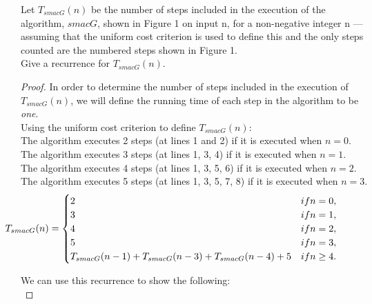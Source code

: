 \documentclass[12pt]{article}
\newenvironment{problem}[2][Problem]{\begin{trivlist}
\item[\hskip \labelsep {\bfseries #1}\hskip \labelsep {\bfseries #2.}]}{\end{trivlist}}
\begin{document}

\begin{problem}{4}
Let $T_{smacG}(n)$ be the number of steps included in the execution of the algorithm, $smacG$,
shown in Figure 1 on input n, for a non-negative integer n — assuming that the uniform
cost criterion is used to define this and the only steps counted are the numbered steps
shown in Figure 1.
\\
Give a recurrence for $T_{smacG}(n)$.
\end{problem}

\begin{proof}
    In order to determine the number of steps included in the execution of $T_{smacG}(n)$, we will define the running time of each step in the algorithm to be \textit{one}.\\

    \noindent Using the uniform cost criterion to define $T_{smacG}(n)$: \\
    
    \noindent The algorithm executes 2 steps (at lines 1 and 2) if it is executed when $n = 0$. \\
    \noindent The algorithm executes 3 steps (at lines 1, 3, 4) if it is executed when $n = 1$. \\
    \noindent The algorithm executes 4 steps (at lines 1, 3, 5, 6) if it is executed when $n = 2$. \\
    \noindent The algorithm executes 5 steps (at lines 1, 3, 5, 7, 8) if it is executed when $n = 3$. \\
    
    
    \[ \hspace*{-17mm}T_{smacG}(n) = 
        \begin{cases} 
          2 & if n = 0, \\
          3 & if n = 1, \\
          4 & if n = 2, \\
          5 & if n = 3, \\
          T_{smacG}(n-1) + T_{smacG}(n-3) + T_{smacG}(n-4) + 5 & if n \geq 4.
       \end{cases}
    \]
    
    \noindent We can use this recurrence to show the following:\\
    

\end{proof}
\end{document}
